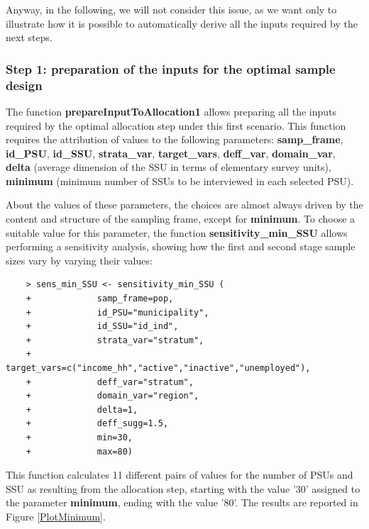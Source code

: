 Anyway, in the following, we will not consider this issue, as we want only to illustrate how it is possible to automatically derive all the inputs required by the next steps.

\subsubsection{Step 1: preparation of the inputs for the optimal sample design}

The function \textbf{prepareInputToAllocation1} allows preparing all the inputs required by the optimal allocation step under this first scenario. 
This function requires the attribution of values to the following parameters:
\textbf{samp\_frame},
\textbf{id\_PSU},
\textbf{id\_SSU}, 
\textbf{strata\_var}, 
\textbf{target\_vars}, 
\textbf{deff\_var}, 
\textbf{domain\_var},
\textbf{delta} (average dimension of the SSU in terms of elementary survey units),
\textbf{minimum} (minimum number of SSUs to be interviewed in each selected PSU).

About the values of these parameters, the choices are almost always driven by the content and structure of the sampling frame, except for \textbf{minimum}. To choose a suitable value for this parameter, the function \textbf{sensitivity\_min\_SSU} allows performing a sensitivity analysis, showing how the first and second stage sample sizes vary by varying their values:

\begin{verbatim}
	> sens_min_SSU <- sensitivity_min_SSU (
	+             samp_frame=pop,
	+             id_PSU="municipality",
	+             id_SSU="id_ind",
	+             strata_var="stratum",
	+             target_vars=c("income_hh","active","inactive","unemployed"),
	+             deff_var="stratum",
	+             domain_var="region",
	+             delta=1,
	+             deff_sugg=1.5,
	+             min=30,
	+             max=80) 
\end{verbatim}

This function calculates 11  different pairs of values for the number of PSUs and SSU as resulting from the allocation step, starting with the value '30' assigned to the parameter \textbf{minimum}, ending with the value '80'.
The results are reported in Figure \ref{PlotMinimum}.


